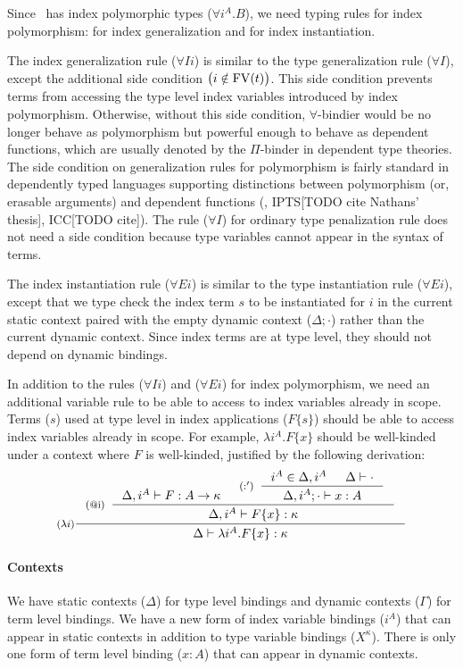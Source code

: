 Since \Fi\ has index polymorphic types ($\forall i^A . B$),
we need typing rules for index polymorphism:
 for index generalization
and  for index instantiation.

The index generalization rule ($\forall I i$) is similar to
the type generalization rule ($\forall I$), except the additional
side condition $\big(i\notin\mathop{\mathrm{FV}}(t)\big)$. This side condition prevents
terms from accessing the type level index variables introduced by index
polymorphism. Otherwise, without this side condition, $\forall$-bindier
would be no longer behave as polymorphism but powerful enough to behave as
dependent functions, which are usually denoted by the $\Pi$-binder in
dependent type theories. The side condition on generalization rules
for polymorphism is fairly standard in dependently typed languages supporting
distinctions between polymorphism (or, erasable arguments) and
dependent functions (\eg, IPTS[TODO cite Nathans' thesis], ICC[TODO cite]).
The rule ($\forall I$) for ordinary type penalization rule does not need
a side condition because type variables cannot appear in the syntax of terms.

The index instantiation rule ($\forall E i$) is similar to
the type instantiation rule ($\forall E i$), except that
we type check the index term $s$ to be instantiated for $i$
in the current static context paired with the empty dynamic context
($\Delta;\cdot$) rather than the current dynamic context.
Since index terms are at type level, they should not depend on dynamic bindings.

In addition to the rules ($\forall I i$) and ($\forall E i$) for
index polymorphism, we need an additional variable rule 
to be able to access to index variables already in scope. Terms ($s$) used
at type level in index applications ($F\{s\}$) should be able to access
index variables already in scope. For example, $\lambda i^A.F\{x\}$ should be
well-kinded under a context where $F$ is well-kinded,
justified by the following derivation:
\[ \inference[($\lambda i$)]
      { \inference[(@i)]{ \Delta, i^A |- F : A -> \kappa
                        & \inference[($:'$)]{ i^A\in \Delta,i^A
                                            & \Delta |- \cdot }
                                            {\Delta,i^A;\cdot |- x:A}
                        }
                        {\Delta, i^A |- F\{x\} : \kappa} }
      {\Delta |- \lambda i^A.F\{x\} :\kappa}
\]

\paragraph{Contexts}
We have static contexts ($\Delta$) for type level bindings
and dynamic contexts ($\Gamma$) for term level bindings.
We have a new form of index variable bindings ($i^A$) that can appear in
static contexts in addition to type variable bindings ($X^\kappa$).
There is only one form of term level binding ($x:A$) that can appear in
dynamic contexts.

